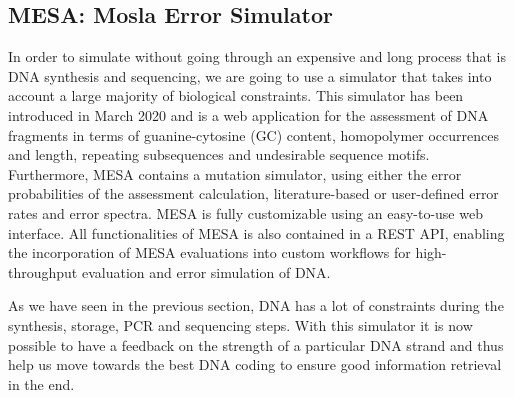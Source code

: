 \subsection{MESA: Mosla Error Simulator}

In order to simulate without going through an expensive and long process that is DNA synthesis and sequencing, we are going to use a simulator that takes into account a large majority of biological constraints.
This simulator has been introduced \cite{bib:10.1093/bioinformatics/btaa140} in March 2020 and is a web application for the assessment of DNA fragments in terms of guanine-cytosine (GC) content, homopolymer occurrences and length, repeating subsequences and undesirable sequence motifs.
Furthermore, MESA contains a mutation simulator, using either the error probabilities of the assessment calculation, literature-based or user-defined error rates and error spectra. MESA is fully customizable using an easy-to-use web interface. All functionalities of MESA is also contained in a REST API, enabling the incorporation of MESA evaluations into custom workflows for high-throughput evaluation and error simulation of DNA.

As we have seen in the previous section, DNA has a lot of constraints during the synthesis, storage, PCR and sequencing steps. With this simulator it is now possible to have a feedback on the strength of a particular DNA strand and thus help us move towards the best DNA coding to ensure good information retrieval in the end.

